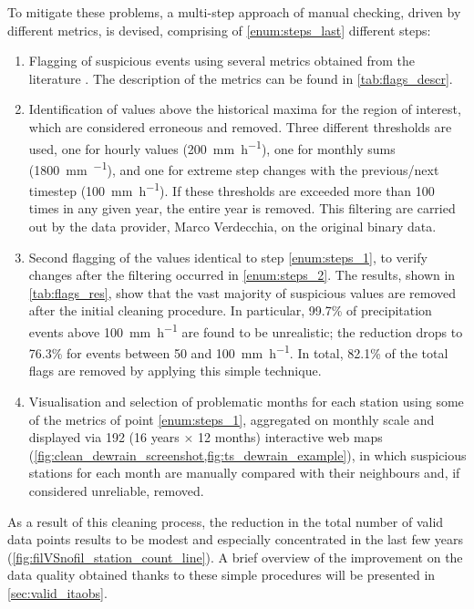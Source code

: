 To mitigate these problems, a multi-step approach of manual checking, driven by different metrics, is devised, comprising of \ref*{enum:steps_last} different steps:
\begin{enumerate}
    \item Flagging of suspicious events using several metrics obtained from the literature \citep{WMO2008}. The description of the metrics can be found in \cref{tab:flags_descr}. \label{enum:steps_1}
    \item Identification of values above the historical maxima for the region of interest, which are considered erroneous and removed. Three different thresholds are used, one for hourly values (\SI{200}{\milli\metre\per\hour}), one for monthly sums (\SI{1800}{\milli\metre\per\month}), and one for extreme step changes with the previous/next timestep (\SI{100}{\milli\metre\per\hour}). If these thresholds are exceeded more than 100 times in any given year, the entire year is removed. This filtering are carried out by the data provider, Marco Verdecchia, on the original binary data. \label{enum:steps_2}
    \item Second flagging of the values identical to step \ref{enum:steps_1}, to verify changes after the filtering occurred in \ref{enum:steps_2}. The results, shown in \cref{tab:flags_res}, show that the vast majority of suspicious values are removed after the initial cleaning procedure. In particular, 99.7\% of precipitation events above \SI{100}{\milli\meter\per\hour} are found to be unrealistic; the reduction drops to 76.3\% for events between 50 and \SI{100}{\milli\meter\per\hour}.
    In total, 82.1\% of the total flags are removed by applying this simple technique.
    \item Visualisation and selection of problematic months for each station using some of the metrics of point \cref{enum:steps_1}, aggregated on monthly scale and displayed via 192 (16 years $\times$ 12 months) interactive web maps (\cref{fig:clean_dewrain_screenshot,fig:ts_dewrain_example}), in which suspicious stations for each month are manually compared with their neighbours and, if considered unreliable, removed. \label{enum:steps_last}
\end{enumerate}
As a result of this cleaning process, the reduction in the total number of valid data points results to be modest and especially concentrated in the last few years (\cref{fig:filVSnofil_station_count_line}). A brief overview of the improvement on the data quality obtained thanks to these simple procedures will be presented in \cref{sec:valid_itaobs}.
